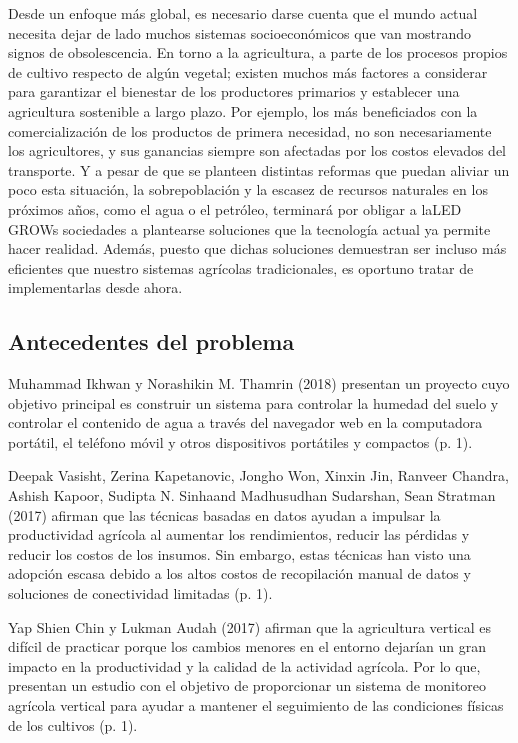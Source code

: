\documentclass{report}
\begin{document}
Desde un enfoque más global, es necesario darse cuenta que el mundo actual
necesita dejar de lado muchos sistemas socioeconómicos que van mostrando signos
de obsolescencia. En torno a la agricultura, a parte de los procesos propios de
cultivo respecto de algún vegetal; existen muchos más factores a considerar para
garantizar el bienestar de los productores primarios y establecer una
agricultura sostenible a largo plazo. Por ejemplo, los más beneficiados con la
comercialización de los productos de primera necesidad, no son necesariamente
los agricultores, y sus ganancias siempre son afectadas por los costos elevados
del transporte. Y a pesar de que se planteen distintas reformas que puedan
aliviar un poco esta situación, la sobrepoblación y la escasez de recursos
naturales en los próximos años, como el agua o el petróleo, terminará por
obligar a laLED GROWs sociedades a plantearse soluciones que la tecnología actual ya
permite hacer realidad. Además, puesto que dichas soluciones demuestran ser
incluso más eficientes que nuestro sistemas agrícolas tradicionales, es oportuno
tratar de implementarlas desde ahora.
\subsection{Antecedentes del problema}
Muhammad Ikhwan y Norashikin M. Thamrin (2018) presentan un proyecto cuyo
objetivo principal es construir un sistema para controlar la humedad del suelo y
controlar el contenido de agua a través del navegador web en la computadora
portátil, el teléfono móvil y otros dispositivos portátiles y compactos (p. 1).

Deepak Vasisht, Zerina Kapetanovic, Jongho Won, Xinxin Jin, Ranveer Chandra,
Ashish Kapoor, Sudipta N. Sinhaand Madhusudhan Sudarshan, Sean Stratman (2017)
afirman que las técnicas basadas en datos ayudan a impulsar la productividad
agrícola al aumentar los rendimientos, reducir las pérdidas y reducir los costos
de los insumos. Sin embargo, estas técnicas han visto una adopción escasa debido
a los altos costos de recopilación manual de datos y soluciones de conectividad
limitadas (p. 1).

Yap Shien Chin y Lukman Audah (2017) afirman que la agricultura vertical es
difícil de practicar porque los cambios menores en el entorno dejarían un gran
impacto en la productividad y la calidad de la actividad agrícola. Por lo que,
presentan un estudio con el objetivo de proporcionar un sistema de monitoreo
agrícola vertical para ayudar a mantener el seguimiento de las condiciones
físicas de los cultivos (p. 1).
\end{document}
